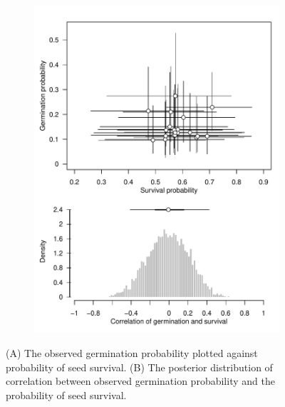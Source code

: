 \documentclass[12pt, oneside, titlepage]{article}   	%
\begin{document}
 \begin{figure}
\centering
\begin{subfigure}[h]{.65\textwidth}
\centering
       \includegraphics[page=1,width=1\textwidth]{../figures/analysis/correlation-germ-surv.pdf}  
\end{subfigure}
 \caption{ (A) The observed germination probability plotted against probability of seed survival. (B) The posterior distribution of correlation between observed germination probability and the probability of seed survival. }
  \label{fig:correlation-germ-surv}
 \end{figure}
 
\end{document}
